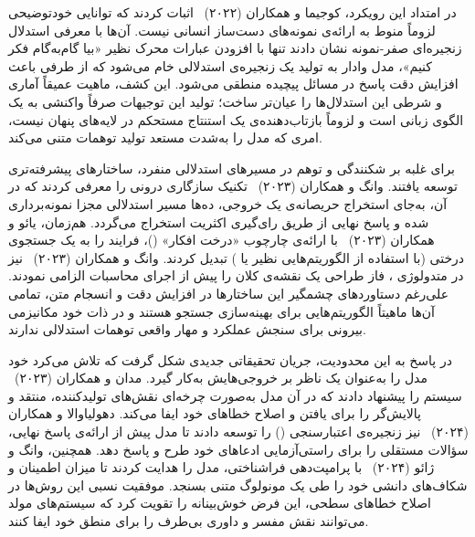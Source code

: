 در امتداد این رویکرد، کوجیما و همکاران (۲۰۲۲)~\cite{kojima2022large} اثبات کردند که توانایی خودتوضیحی لزوماً منوط به ارائه‌ی نمونه‌های دست‌ساز انسانی نیست. آن‌ها با معرفی استدلال زنجیره‌ای صفر-نمونه نشان دادند تنها با افزودن عبارات محرک نظیر «بیا گام‌به‌گام فکر کنیم»، مدل وادار به تولید یک زنجیره‌ی استدلالی خام می‌شود که از طرفی باعث افزایش دقت پاسخ در مسائل پیچیده منطقی می‌شود. این کشف، ماهیت عمیقاً آماری و شرطی این استدلال‌ها را عیان‌تر ساخت؛ تولید این توجیهات صرفاً واکنشی به یک الگوی زبانی است و لزوماً بازتاب‌دهنده‌ی یک استنتاج مستحکم در لایه‌های پنهان نیست، امری که مدل را به‌شدت مستعد تولید توهمات متنی می‌کند.

برای غلبه بر شکنندگی و توهم در مسیرهای استدلالی منفرد، ساختارهای پیشرفته‌تری توسعه یافتند. وانگ و همکاران (۲۰۲۳)~\cite{wang2023selfconsistency} تکنیک سازگاری درونی را معرفی کردند که در آن، به‌جای استخراج حریصانه‌ی یک خروجی، ده‌ها مسیر استدلالی مجزا نمونه‌برداری شده و پاسخ نهایی از طریق رای‌گیری اکثریت استخراج می‌گردد. هم‌زمان، یائو و همکاران (۲۰۲۳)~\cite{yao2023tree} با ارائه‌ی چارچوب «درخت افکار» ()، فرایند را به یک جستجوی درختی (با استفاده از الگوریتم‌هایی نظیر  یا ) تبدیل کردند. وانگ و همکاران (۲۰۲۳)~\cite{wang2023planandsolve} نیز در متدولوژی ، فاز طراحی یک نقشه‌ی کلان را پیش از اجرای محاسبات الزامی نمودند. علی‌رغم دستاوردهای چشمگیر این ساختارها در افزایش دقت و انسجام متن، تمامی آن‌ها ماهیتاً الگوریتم‌هایی برای بهینه‌سازی جستجو هستند و در ذات خود مکانیزمی بیرونی برای سنجش عملکرد و مهار واقعی توهمات استدلالی ندارند.

در پاسخ به این محدودیت، جریان تحقیقاتی جدیدی شکل گرفت که تلاش می‌کرد خود مدل را به‌عنوان یک ناظر بر خروجی‌هایش به‌کار گیرد. مدان و همکاران (۲۰۲۳)~\cite{madaan2023selfrefine} سیستم  را پیشنهاد دادند که در آن مدل به‌صورت چرخه‌ای نقش‌های تولیدکننده، منتقد و پالایش‌گر را برای یافتن و اصلاح خطاهای خود ایفا می‌کند. دهولیاوالا و همکاران (۲۰۲۴)~\cite{dhuliawala2024chain} نیز زنجیره‌ی اعتبارسنجی () را توسعه دادند تا مدل پیش از ارائه‌ی پاسخ نهایی، سؤالات مستقلی را برای راستی‌آزمایی ادعاهای خود طرح و پاسخ دهد. همچنین، وانگ و ژائو (۲۰۲۴)~\cite{wang2024metacognitive} با پرامپت‌دهی فراشناختی، مدل را هدایت کردند تا میزان اطمینان و شکاف‌های دانشی خود را طی یک مونولوگ متنی بسنجد. موفقیت نسبی این روش‌ها در اصلاح خطاهای سطحی، این فرض خوش‌بینانه را تقویت کرد که سیستم‌های مولد می‌توانند نقش مفسر و داوری بی‌طرف را برای منطق خود ایفا کنند.

